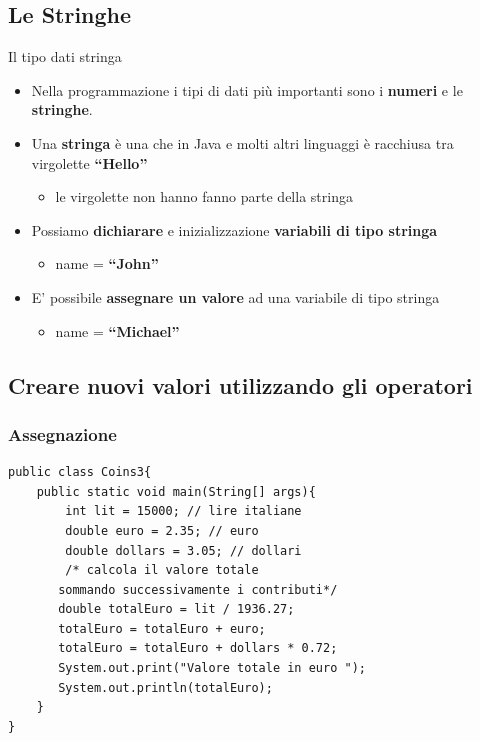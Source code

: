 \subsection*{Le Stringhe}
\begin{frame}
\begin{block}{Il tipo dati stringa}
\begin{itemize}
\item Nella programmazione i tipi di dati più importanti sono i \textbf{numeri} e le \textbf{stringhe}.
\item Una \textbf{stringa} è una  che in Java e molti altri linguaggi è racchiusa
tra virgolette \textbf{``Hello''}
\begin{itemize}
\item le virgolette non hanno fanno parte della stringa
\end{itemize}
\item Possiamo \textbf{dichiarare} e inizializzazione \textbf{variabili di tipo stringa} 
\begin{itemize}
\item {} \alert{name} = \textbf{``John''}
\end{itemize}
\item E' possibile \textbf{assegnare un valore} ad una variabile di tipo stringa
\begin{itemize}
\item \alert{name} = \textbf{``Michael''}
\end{itemize}
\end{itemize}
\end{block}
\end{frame}

\subsection*{Creare nuovi valori utilizzando gli operatori}
\begin{frame}[fragile]
\frametitle{Assegnazione}
\begin{lstlisting}
public class Coins3{ 
    public static void main(String[] args){ 
        int lit = 15000; // lire italiane
        double euro = 2.35; // euro
        double dollars = 3.05; // dollari
        /* calcola il valore totale
       sommando successivamente i contributi*/
       double totalEuro = lit / 1936.27;
       totalEuro = totalEuro + euro;
       totalEuro = totalEuro + dollars * 0.72;
       System.out.print("Valore totale in euro ");
       System.out.println(totalEuro);
    }
}
\end{lstlisting}
\end{frame}

